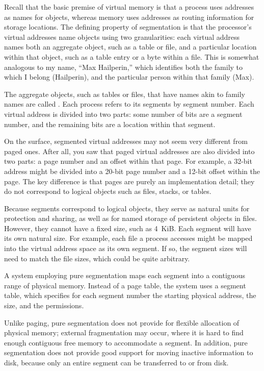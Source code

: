 Recall that the basic premise of virtual memory is that a process uses
addresses as names for objects, whereas memory uses addresses as
routing information for storage locations.  The defining property of
segmentation is that the processor's virtual addresses name
objects using two granularities: each virtual address names both
an aggregate object, such as a table or file, and a particular
location within that object, such as a table entry or a byte within a
file.  This is somewhat analogous to my name, ``Max Hailperin,''
which identifies both the family to which I belong (Hailperin), and
the particular person within that family (Max).

The aggregate objects, such as tables or files, that have names akin
to family names are called .  Each process refers to
its segments by segment number.  Each virtual address is divided into
two parts: some number of bits are a segment number, and the remaining
bits are a location within that segment.

On the surface, segmented virtual addresses may not seem very
different from paged ones.  After all, you saw that paged virtual
addresses are also divided into two parts: a page number and an offset
within that page.  For example, a 32-bit address might be divided into a
20-bit page number and a 12-bit offset within the page.  The key
difference is that pages are purely an implementation detail; they do
not correspond to logical objects such as files, stacks, or tables.

Because segments correspond to logical objects, they serve
as natural units for protection and sharing, as well as for
named storage of persistent objects in files.
However, they cannot have a
fixed size, such as 4~KiB.  Each segment will have its own natural
size.  For example, each file a process accesses might be mapped into
the virtual address space as its own segment.  If so, the segment
sizes will need to match the file sizes, which could be quite
arbitrary.

A system employing pure segmentation maps each segment into a
contiguous range of physical memory.  Instead of a page table, the
system uses a segment table, which specifies for each segment number
the starting physical address, the size, and the permissions.

Unlike paging, pure segmentation does not provide for flexible
allocation of physical memory; external fragmentation may occur, where
it is hard to find enough contiguous free memory to accommodate a
segment.  In addition, pure segmentation does not provide good support for
moving inactive information to disk, because only an entire segment
can be transferred to or from disk.


